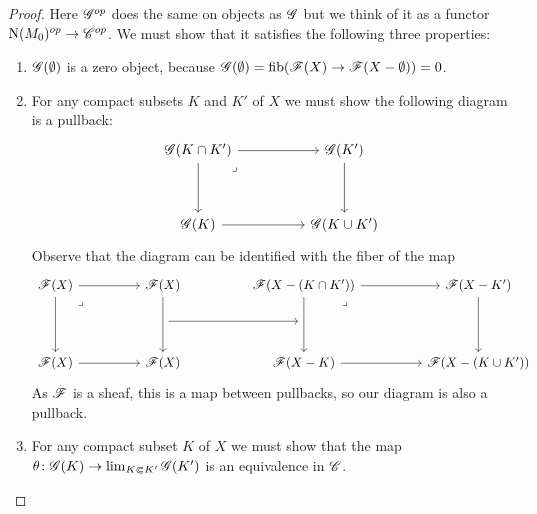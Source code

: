 \documentclass[../../thesis.tex]{subfiles}
\begin{document}
\begin{proof}
    Here $\mathscr{G}^{op}$ does the same on objects as $\mathscr{G}$ but we think of it as a functor $\mathrm{N}(M_0)^{op}\to \mathscr{C}^{op}$.
    We must show that it satisfies the following three properties:
    \begin{enumerate}
        \item $\mathscr{G}(\emptyset)$ is a zero object, because $\mathscr{G}(\emptyset)=\operatorname{fib}(\mathscr{F}(X)\to \mathscr{F}(X-\emptyset))=0$.
        \item For any compact subsets $K$ and $K'$ of $X$ we must show the following diagram is a pullback:
              \[\begin{tikzcd}
                      {\G(K\cap K')} && {\G(K')} \\
                      \\
                      {\G(K)} && {\G(K\cup K')}
                      \arrow[from=1-1, to=3-1]
                      \arrow[from=3-1, to=3-3]
                      \arrow[from=1-1, to=1-3]
                      \arrow[from=1-3, to=3-3]
                      \arrow["\lrcorner"{anchor=center, pos=0.125}, draw=none, from=1-1, to=3-3]
                  \end{tikzcd}\]
              Observe that the diagram can be identified with the fiber of the map
              \[\begin{tikzcd}
                      {\F(X)} && {\F(X)} && {\F(X-(K\cap K'))} && {\F(X-K')} \\
                      && {} && {} \\
                      {\F(X)} && {\F(X)} && {\F(X-K)} && {\F(X-(K\cup K'))}
                      \arrow[from=1-5, to=3-5]
                      \arrow[from=3-5, to=3-7]
                      \arrow[from=1-5, to=1-7]
                      \arrow[from=1-7, to=3-7]
                      \arrow["\lrcorner"{anchor=center, pos=0.125}, draw=none, from=1-5, to=3-7]
                      \arrow[from=2-3, to=2-5]
                      \arrow[from=1-3, to=3-3]
                      \arrow[from=1-1, to=1-3]
                      \arrow[from=1-1, to=3-1]
                      \arrow[from=3-1, to=3-3]
                      \arrow["\lrcorner"{anchor=center, pos=0.125}, draw=none, from=1-1, to=3-3]
                  \end{tikzcd}\]
              As $\mathscr{F}$ is a sheaf, this is a map between pullbacks, so our diagram is also a pullback.
        \item For any compact subset $K$ of $X$ we must show that the map $\theta\colon \mathscr{G}(K)\to \lim_{K\Subset K'}\mathscr{G}(K')$ is an equivalence in $\mathscr{C}$.

\end{enumerate}
\end{proof}
\end{document}
